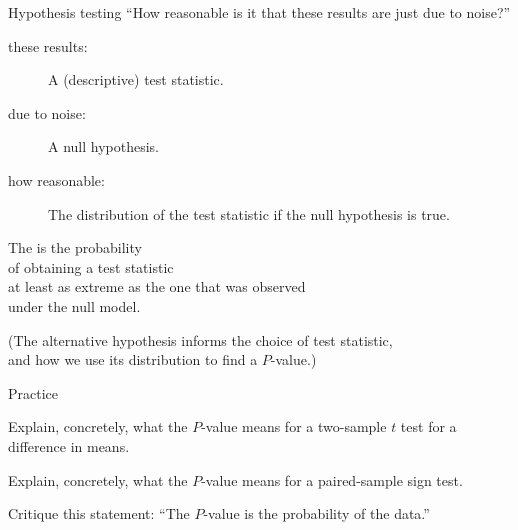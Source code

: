 \begin{frame}{Hypothesis testing}
    \alert{``How reasonable is it that these results are just due to noise?''}

    \begin{description}
        \item[these results:] A (descriptive) test statistic.  
        \item[due to noise:] A null hypothesis.
        \item[how reasonable:] The distribution of the test statistic if the null hypothesis is true. 
    \end{description}

    \vspace{2em}
    \pause

    The  is the probability \\
    of obtaining a test statistic \\
    at least as extreme as the one that was observed\\
    under the null model.

    \vspace{2em}
    \pause
    (The alternative hypothesis informs the choice of test statistic,\\
    and how we use its distribution to find a $P$-value.)

\end{frame}

\begin{frame}{Practice}

    Explain, concretely, what the $P$-value means for a two-sample $t$ test
    for a difference in means.
    \vfill

    Explain, concretely, what the $P$-value means for a paired-sample sign test.
    \vfill

    Critique this statement: ``The $P$-value is the probability of the data.''
    \vfill
    
\end{frame}
    
